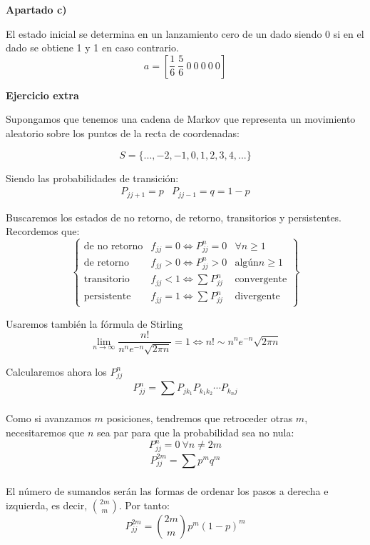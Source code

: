 \documentclass[openany]{book}
\begin{document}
\begin{exercise}
\begin{flushright}
    \textbf{Apartado c)}
\end{flushright}

El estado inicial se determina en un lanzamiento cero de un dado siendo 0 si en el dado se obtiene 1 y 1 en caso contrario.
$$ a = \left[\dfrac{1}{6}\ \dfrac{5}{6}\ 0\ 0\ 0\ 0\ 0\right] $$


\end{exercise}

\begin{exercise}
    \textbf{Ejercicio extra}

    Supongamos que tenemos una cadena de Markov que representa un movimiento aleatorio sobre los puntos de la recta de coordenadas:
    
    $$S = \{...,-2,-1,0,1,2,3,4,...\} $$

    Siendo las probabilidades de transición:
    $$ 
    \begin{matrix}
        P_{jj+1} = p & P_{jj-1} = q = 1-p  
    \end{matrix}$$

    Buscaremos los estados de no retorno, de retorno, transitorios y persistentes. Recordemos que:
    $$ \left\{
    \begin{array}{ccc}
        \text{de no retorno} &  f_{jj} = 0 \iff P_{jj}^{n} = 0 & \forall  n \geq  1      \\ 
        \text{de retorno} &  f_{jj} > 0 \iff P_{jj}^{n} > 0 & \text{algún}  n \geq  1 \\ 
        \text{transitorio} &  f_{jj} < 1 \iff \sum\limits_{}^{} P_{jj}^{n}  & \text{convergente}\\ 
        \text{persistente} &  f_{jj} = 1 \iff \sum\limits_{}^{} P_{jj}^{n}  & \text{divergente}
    \end{array}
    \right\} $$

    Usaremos también la fórmula de Stirling 
    $$ \lim_{n \to \infty} \dfrac{n! }{n^{n}e^{-n}\sqrt{2\pi n}} = 1 \iff n ! \sim n^{n}e^{-n} \sqrt{2\pi n} $$


    Calcularemos ahora los $ P_{jj}^{n} $
    $$ P_{jj}^{n} = \sum\limits_{}^{} P_{jk_1}P_{k_1k_2}\cdots P_{k_nj} $$

    Como si avanzamos $ m $ posiciones, tendremos que retroceder otras $ m $, necesitaremos que $ n $ sea par para que la probabilidad sea no nula:
    $$ P_{jj}^{n} = 0\ \forall n \ne 2m $$
    $$ P_{jj}^{2m} = \sum\limits_{}^{} p^{m}q^{m} $$

    El número de sumandos serán las formas de ordenar los pasos a derecha e izquierda, es decir, $ \binom{2m}{m} $. Por tanto:
    $$ P_{jj}^{2m} = \binom{2m}{m}p^{m}(1-p)^{m} $$


\end{exercise}
\end{document}
